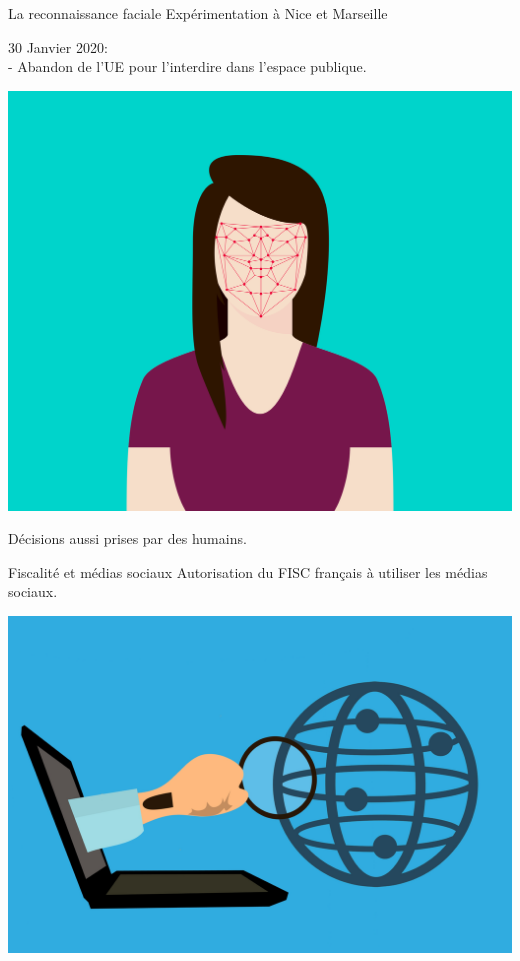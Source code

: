 \begin{frame}{La reconnaissance faciale}
  \tiny
  Expérimentation à Nice et Marseille

  30 Janvier 2020: \\
    - Abandon de l'UE pour l'interdire dans l'espace publique.

  \begin{center}
  \includegraphics[width=.7\textwidth]{usages/reconnaissance_facial.png}
  \end{center}

  Décisions aussi prises par des humains.
\end{frame}

\begin{frame}{Fiscalité et médias sociaux}
  \small
  Autorisation du FISC français à utiliser les médias sociaux.

  \begin{center}
  \includegraphics[width=.7\textwidth]{usages/loupe.jpg}
  \end{center}
\end{frame}

